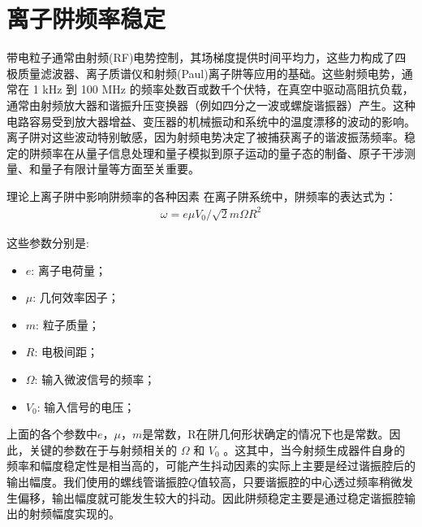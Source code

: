 
\chapter[离子阱频率稳定]{离子阱频率稳定}


带电粒子通常由射频(RF)电势控制，其场梯度提供时间平均力，这些力构成了四极质量滤波器、离子质谱仪和射频(Paul)离子阱等应用的基础\cite[]{Dehmelt_1990, Paul_1990}。这些射频电势，通常在 1 kHz 到 100 MHz 的频率处数百或数千个伏特，在真空中驱动高阻抗负载，通常由射频放大器和谐振升压变换器（例如四分之一波或螺旋谐振器）产生\cite[]{Siverns_Simkins_Weidt_Hensinger_2012}。这种电路容易受到放大器增益、变压器的机械振动和系统中的温度漂移的波动的影响。离子阱对这些波动特别敏感，因为射频电势决定了被捕获离子的谐波振荡频率。稳定的阱频率在从量子信息处理\cite[]{Blatt_Wineland_2008, Monroe_Kim_2013}和量子模拟\cite[]{Richerme_Gong_Lee_Senko_Smith_Foss_Feig_Michalakis_Gorshkov_Monroe_2014, Jurcevic_Lanyon_Hauke_Hempel_Zoller_Blatt_Roos_2014}到原子运动的量子态的制备\cite[]{Leibfried_Blatt_Monroe_Wineland_2003}、原子干涉测量\cite[]{Johnson_Neyenhuis_Mizrahi_Wong_Campos_Monroe_2015}、和量子有限计量\cite[]{Chou_Hume_Koelemeij_Wineland_Rosenband_2010}等方面至关重要。


理论上离子阱中影响阱频率的各种因素
在离子阱系统中，阱频率的表达式为：
\begin{align}
    \omega=e\mu V_0/\sqrt{2}m\Omega R^2
\end{align}

这些参数分别是:
\begin{itemize}
    \item $e$: 离子电荷量；
    \item $\mu$: 几何效率因子；
    \item $m$: 粒子质量；
    \item $R$: 电极间距；
    \item $\Omega$: 输入微波信号的频率；
    \item $V_0$: 输入信号的电压；
\end{itemize}


上面的各个参数中$e$，$\mu$，$m$是常数，R在阱几何形状确定的情况下也是常数。因此，关键的参数在于与射频相关的 $\Omega$ 和 $V_0$ 。这其中，当今射频生成器件自身的频率和幅度稳定性是相当高的，可能产生抖动因素的实际上主要是经过谐振腔后的输出幅度。我们使用的螺线管谐振腔$Q$值较高，只要谐振腔的中心透过频率稍微发生偏移，输出幅度就可能发生较大的抖动。因此阱频稳定主要是通过稳定谐振腔输出的射频幅度实现的。

